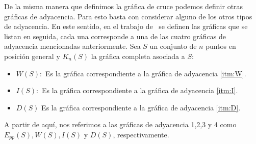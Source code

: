%

De la misma manera que definimos la gráfica de cruce podemos definir otras
gráficas de adyacencia. Para esto basta con considerar alguno de los otros
tipos de adyacencia. En este sentido, en el trabajo de~\cite{Araujo2005} se
definen las gráficas que se listan en seguida, cada una corresponde
a una de las cuatro gráficas de adyacencia mencionadas anteriormente.
Sea $S$ un conjunto de $n$ puntos en posición general y $K_n(S)$
la gráfica completa asociada a $S$:

\begin{itemize}
  \item $W(S):$ Es la gráfica correspondiente a la gráfica de adyacencia
  \ref{itm:W}.
  \item $I(S):$ Es la gráfica correspondiente a la gráfica de adyacencia
  \ref{itm:I}.
  \item $D(S)$  Es la gráfica correspondiente a la gráfica de adyacencia
  \ref{itm:D}.
\end{itemize}
A partir de aquí, nos referimos a las gráficas de adyacencia 1,2,3 y 4 como
$E_{pp}(S),W(S),I(S)$ y $D(S)$, respectivamente.

